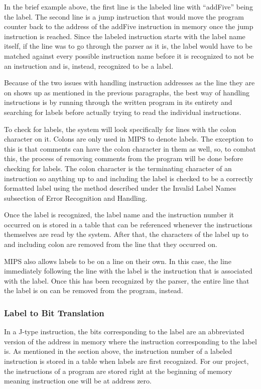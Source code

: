 \documentclass[parskip=half, fontsize=12pt]{scrartcl}
\begin{document}
In the brief example above, the first line is the labeled line with
``addFive'' being the label. The second line is a jump instruction that
would move the program counter back to the address of the addFive
instruction in memory once the jump instruction is reached. Since the
labeled instruction starts with the label name itself, if the line was
to go through the parser as it is, the label would have to be matched
against every possible instruction name before it is recognized to not
be an instruction and is, instead, recognized to be a label.

Because of the two issues with handling instruction addresses as the
line they are on shows up as mentioned in the previous paragraphs, the
best way of handling instructions is by running through the written
program in its entirety and searching for labels before actually trying
to read the individual instructions.

To check for labels, the system will look specifically for lines with
the colon character on it. Colons are only used in MIPS to denote
labels. The exception to this is that comments can have the colon
character in them as well, so, to combat this, the process of removing
comments from the program will be done before checking for labels. The
colon character is the terminating character of an instruction so
anything up to and including the label is checked to be a correctly
formatted label using the method described under the Invalid Label Names
subsection of Error Recognition and Handling.

Once the label is recognized, the label name and the instruction number
it occurred on is stored in a table that can be referenced whenever the
instructions themselves are read by the system. After that, the
characters of the label up to and including colon are removed from the
line that they occurred on.

MIPS also allows labels to be on a line on their own. In this case, the
line immediately following the line with the label is the instruction
that is associated with the label. Once this has been recognized by the
parser, the entire line that the label is on can be removed from the
program, instead.

\subsubsection{Label to Bit Translation}

In a J-type instruction, the bits corresponding to the label are an
abbreviated version of the address in memory where the instruction
corresponding to the label is. As mentioned in the section above, the
instruction number of a labeled instruction is stored in a table when
labels are first recognized. For our project, the instructions of a
program are stored right at the beginning of memory meaning instruction
one will be at address zero.
\end{document}

